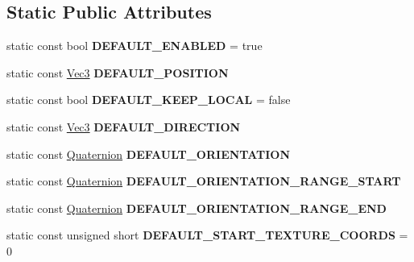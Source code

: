 \subsection*{Static Public Attributes}
\begin{DoxyCompactItemize}
\item 
\mbox{\label{classPUEmitter_ab7cade225c5f85ddb154eb7757a8fe73}} 
static const bool {\bfseries D\+E\+F\+A\+U\+L\+T\+\_\+\+E\+N\+A\+B\+L\+ED} = true
\item 
\mbox{\label{classPUEmitter_a87ad2a23f5b5b4ab0deb8828d2cc2687}} 
static const \hyperlink{classVec3}{Vec3} {\bfseries D\+E\+F\+A\+U\+L\+T\+\_\+\+P\+O\+S\+I\+T\+I\+ON}
\item 
\mbox{\label{classPUEmitter_a21826dfa28bcb5a4696d6c9b0d459b5b}} 
static const bool {\bfseries D\+E\+F\+A\+U\+L\+T\+\_\+\+K\+E\+E\+P\+\_\+\+L\+O\+C\+AL} = false
\item 
\mbox{\label{classPUEmitter_acc10c7982b6e5e53db87c98d7abe5901}} 
static const \hyperlink{classVec3}{Vec3} {\bfseries D\+E\+F\+A\+U\+L\+T\+\_\+\+D\+I\+R\+E\+C\+T\+I\+ON}
\item 
\mbox{\label{classPUEmitter_a946dcc35eed7b6d4430b9fe9a5d4aaff}} 
static const \hyperlink{classQuaternion}{Quaternion} {\bfseries D\+E\+F\+A\+U\+L\+T\+\_\+\+O\+R\+I\+E\+N\+T\+A\+T\+I\+ON}
\item 
\mbox{\label{classPUEmitter_aa4903227e7a7ac42193f3e0f0ad574cb}} 
static const \hyperlink{classQuaternion}{Quaternion} {\bfseries D\+E\+F\+A\+U\+L\+T\+\_\+\+O\+R\+I\+E\+N\+T\+A\+T\+I\+O\+N\+\_\+\+R\+A\+N\+G\+E\+\_\+\+S\+T\+A\+RT}
\item 
\mbox{\label{classPUEmitter_ae575a0a27986f59563686217e80fc8dd}} 
static const \hyperlink{classQuaternion}{Quaternion} {\bfseries D\+E\+F\+A\+U\+L\+T\+\_\+\+O\+R\+I\+E\+N\+T\+A\+T\+I\+O\+N\+\_\+\+R\+A\+N\+G\+E\+\_\+\+E\+ND}
\item 
\mbox{\label{classPUEmitter_a9d0fc1470a93c3fcbe6e619a6b9a27c4}} 
static const unsigned short {\bfseries D\+E\+F\+A\+U\+L\+T\+\_\+\+S\+T\+A\+R\+T\+\_\+\+T\+E\+X\+T\+U\+R\+E\+\_\+\+C\+O\+O\+R\+DS} = 0

\end{DoxyCompactItemize}
